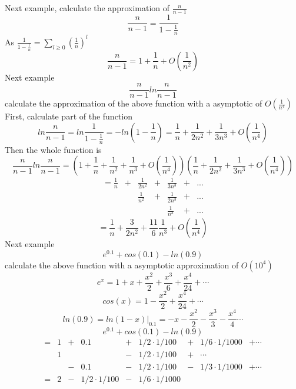 \documentclass[11pt]{article}
\begin{document}
\subsection{}
Next example, calculate the approximation of \(\frac{n}{n-1}\)
\[
\frac{n}{n-1}=\frac{1}{1-\frac{1}{n}}
\]
As \(\frac{1}{1-\frac{1}{n}}=\sum_{l\geq 0}(\frac{1}{n})^l\)
\[
\frac{n}{n-1}=1+\frac{1}{n}+O(\frac{1}{n^2})
\]
Next example \\
\[
\frac{n}{n-1}ln\frac{n}{n-1}
\]
calculate the approximation of the above function with a asymptotic of \(O(\frac{1}{n^4})\)
First, calculate part of the function \\
\[
ln\frac{n}{n-1}=ln\frac{1}{1-\frac{1}{n}}=-ln(1-\frac{1}{n})=\frac{1}{n}+\frac{1}{2n^2}+\frac{1}{3n^3}+O(\frac{1}{n^4})
\]
Then the whole function is \\
\[
\frac{n}{n-1}ln\frac{n}{n-1}=\left(1+\frac{1}{n}+\frac{1}{n^2}+\frac{1}{n^3}+O\left(\frac{1}{n^4}\right)\right)\left(\frac{1}{n}+\frac{1}{2n^2}+\frac{1}{3n^3}+O\left(\frac{1}{n^4}\right)\right)
\]
\[
\begin{matrix}
=\frac{1}{n} & + &\frac{1}{2n^2} & + & \frac{1}{3n^3} & + & ... \\
         ~       & ~ &\frac{1}{n^2}  & + & \frac{1}{2n^3} & + & ... \\
         ~       & ~ &       ~           & ~ &\frac{1}{n^3} & + & ...
\end{matrix}
\]
\[
=\frac{1}{n}+\frac{3}{2n^2}+\frac{11}{6}\frac{1}{n^3}+O\left(\frac{1}{n^4}\right)
\]
Next example \\
\[
e^{0.1}+cos(0.1)-ln(0.9)
\]
calculate the above function with a asymptotic approximation of \(O(10^4)\) \\
\[
e^x=1+x+\frac{x^2}{2}+\frac{x^3}{6}+\frac{x^4}{24}+\cdots
\]
\[
cos(x)=1-\frac{x^2}{2}+\frac{x^4}{24}+\cdots
\]
\[
ln(0.9)=ln(1-x)|_{0.1}=-x-\frac{x^2}{2}-\frac{x^3}{3}-\frac{x^4}{4}\cdots
\]
\[
e^{0.1}+cos(0.1)-ln(0.9)
\]
\[
\begin{matrix}
= & 1 & + & 0.1 & + & 1/2\cdot 1/100 & + & 1/6\cdot 1/1000 & +\cdots \\
~ & 1 & ~ &  ~  & - & 1/2\cdot 1/100 & + & \cdots & ~ \\
~ & ~ & - & 0.1 & - & 1/2\cdot 1/100 & - & 1/3\cdot 1/1000 & +\cdots \\
= & 2 & - & 1/2\cdot 1/100 &-& 1/6\cdot 1/1000
\end{matrix}
\]
\end{document}
